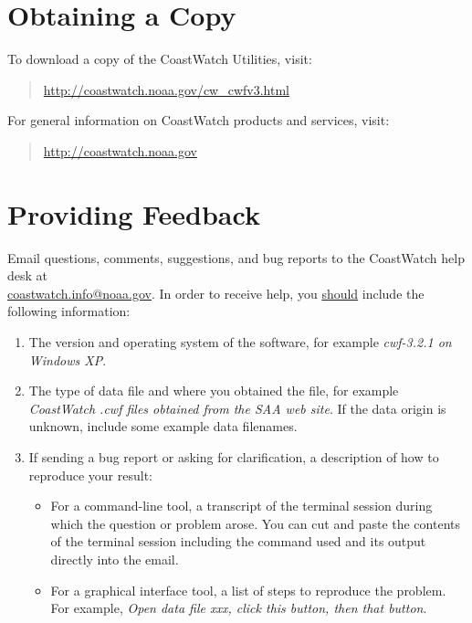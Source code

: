 \section*{Obtaining a Copy}

To download a copy of the CoastWatch Utilities, visit:
\begin{quote}
  \url{http://coastwatch.noaa.gov/cw\_cwfv3.html}
\end{quote}
For general information on CoastWatch products and services, visit:
\begin{quote}
  \url{http://coastwatch.noaa.gov}
\end{quote}

\section*{Providing Feedback}

Email questions, comments, suggestions, and bug reports to the
CoastWatch help desk at \\
\href{mailto:coastwatch.info@noaa.gov}{coastwatch.info@noaa.gov}.
In order to receive help, you \underline{should} include the
following information:
\begin{enumerate}

  \item The version and operating system of the software, for
  example {\em cwf-3.2.1 on Windows XP}.

  \item The type of data file and where you obtained the file,
  for example {\em CoastWatch .cwf files obtained from the SAA web
  site}.  If the data origin is unknown, include some example data
  filenames.

  \item If sending a bug report or asking for clarification, a
  description of how to reproduce your result:
  \begin{itemize}

    \item For a command-line tool, a transcript of the terminal
    session during which the question or problem arose.  You
    can cut and paste the contents
    of the terminal session including the command used and its output
    directly into the email.

    \item For a graphical interface tool, a list of steps to
    reproduce the problem.  For example, {\em
    Open data file xxx, click this button, then that button}.

  \end{itemize}

\end{enumerate}

